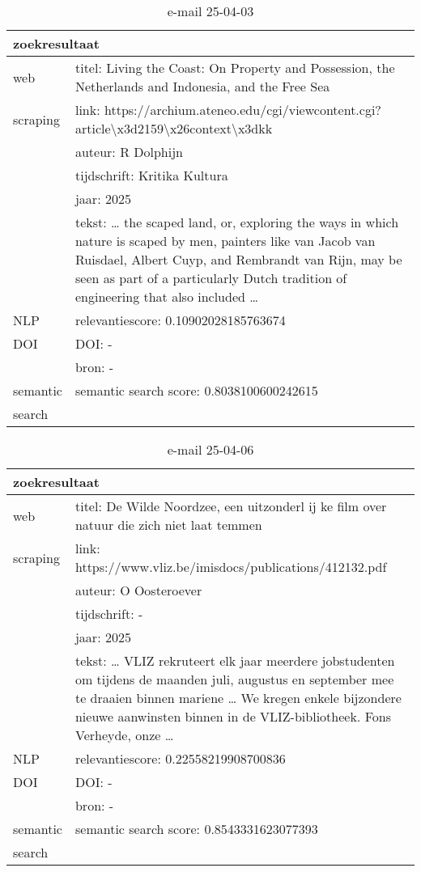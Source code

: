 \begin{table}[h!]
    \caption{e-mail 25-04-03}
    \centering
    \begin{tabularx}{\textwidth}{|p{4cm}|X|} 
        \hline
        \multicolumn{2}{|X|}{\textbf{zoekresultaat}} \\
        \hline
        web &titel: Living the Coast: On Property and Possession, the Netherlands and Indonesia, and the Free Sea\\
        scraping&link: https://archium.ateneo.edu/cgi/viewcontent.cgi?article\textbackslash x3d2159\textbackslash x26context\textbackslash x3dkk\\
        &auteur: R Dolphijn\\
        &tijdschrift: Kritika Kultura\\
        &jaar: 2025\\
        &tekst: … the scaped land, or, exploring the ways in which nature is scaped by men, painters like van Jacob van Ruisdael, Albert Cuyp, and Rembrandt van Rijn, may be seen as part of a particularly Dutch tradition of engineering that also included …\\
        \hline
        NLP&relevantiescore: 0.10902028185763674\\
        \hline
        DOI&DOI: -\\
        &bron: -\\
        \hline
        semantic&semantic search score: 0.8038100600242615\\
        search&\\
        \hline
    \end{tabularx}
    \label{table:email20250403}
\end{table}
\begin{table}[h!]
    \caption{e-mail 25-04-06}
    \centering
    \begin{tabularx}{\textwidth}{|p{4cm}|X|} 
        \hline
        \multicolumn{2}{|X|}{\textbf{zoekresultaat}} \\
        \hline
        web &titel: De Wilde Noordzee, een uitzonderl ij ke film over natuur die zich niet laat temmen\\
        scraping&link: https://www.vliz.be/imisdocs/publications/412132.pdf\\
        &auteur: O Oosteroever\\
        &tijdschrift: -\\
        &jaar: 2025\\
        &tekst: … VLIZ rekruteert elk jaar meerdere jobstudenten om tijdens de maanden juli, augustus en september mee te draaien binnen mariene … We kregen enkele bijzondere nieuwe aanwinsten binnen in de VLIZ-bibliotheek. Fons Verheyde, onze …\\
        \hline
        NLP&relevantiescore: 0.22558219908700836\\
        \hline
        DOI&DOI: -\\
        &bron: -\\
        \hline
        semantic&semantic search score: 0.8543331623077393\\
        search&\\
        \hline
    \end{tabularx}
    \label{table:email20250406}
\end{table}

